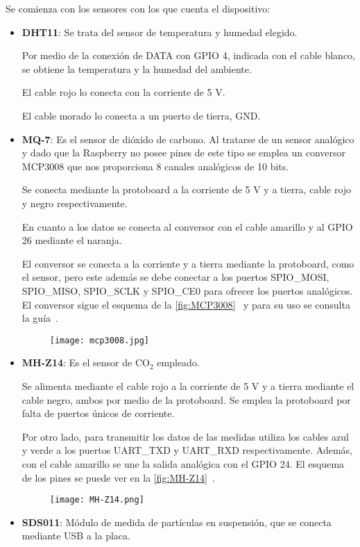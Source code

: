 Se comienza con los sensores con los que cuenta el dispositivo:
\begin{itemize}
	\item \textbf{DHT11}: Se trata del sensor de temperatura y humedad elegido.
	      
	      Por medio de la conexión de DATA con GPIO 4, indicada con el cable blanco, se obtiene la temperatura y la humedad del ambiente. 
	      
	      El cable rojo lo conecta con la corriente de 5 V\@.
	      
	      El cable morado lo conecta a un puerto de tierra, GND\@.
	\item \textbf{MQ-7}: Es el sensor de dióxido de carbono. Al tratarse de un sensor analógico y dado que la Raspberry no posee pines de este tipo se emplea un conversor MCP3008 que nos proporciona 8 canales analógicos de 10 bits.
	      
	      Se conecta mediante la protoboard a la corriente de 5 V y a tierra, cable rojo y negro respectivamente.
	      
	      En cuanto a los datos se conecta al conversor con el cable amarillo y al GPIO 26 mediante el naranja.
	      
	      El conversor se conecta a la corriente y a tierra mediante la protoboard, como el sensor, pero este además se debe conectar a los puertos SPIO\_MOSI, SPIO\_MISO, SPIO\_SCLK y SPIO\_CE0 para ofrecer los puertos analógicos. El conversor sigue el esquema de la \autoref{fig:MCP3008}~\cite{noauthor_27v_2008} y para su uso se consulta la guía~\cite{noauthor_raspberry_nodate-1}.
	      \begin{figure}[H]
		      {\texttt{[image: mcp3008.jpg]}}
	      \end{figure}
	\item \textbf{MH-Z14}: Es el sensor de CO$_2$ empleado.
	      
	      Se alimenta mediante el cable rojo a la corriente de 5 V y a tierra mediante el cable negro, ambos por medio de la protoboard. Se emplea la protoboard por falta de puertos únicos de corriente.
	      
	      Por otro lado, para transmitir los datos de las medidas utiliza los cables azul y verde a los puertos UART\_TXD y UART\_RXD respectivamente. Además, con el cable amarillo se une la salida analógica con el GPIO 24. El esquema de los pines se puede ver en la \autoref{fig:MH-Z14}~\cite{noauthor_documentacion_nodate}.
	      \begin{figure}[H]
		      {\texttt{[image: MH-Z14.png]}}
	      \end{figure}
	\item \textbf{SDS011}: Módulo de medida de partículas en suspensión, que se conecta mediante USB a la placa.
\end{itemize}

